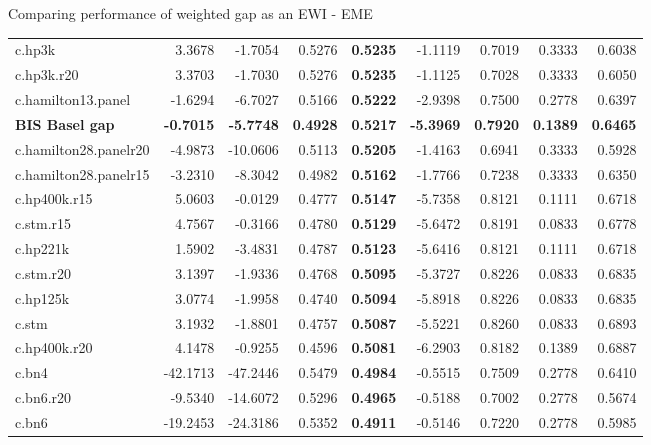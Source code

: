 \documentclass[
  ignorenonframetext,
]{beamer}
\begin{document}
\begin{frame}{Comparing performance of weighted gap as an EWI - EME}
{\begin{tabular}[t]{lrrr>{}rrrrr}
c.hp3k & 3.3678 & -1.7054 & 0.5276 & \textbf{0.5235} & -1.1119 & 0.7019 & 0.3333 & 0.6038\\
c.hp3k.r20 & 3.3703 & -1.7030 & 0.5276 & \textbf{0.5235} & -1.1125 & 0.7028 & 0.3333 & 0.6050\\
c.hamilton13.panel & -1.6294 & -6.7027 & 0.5166 & \textbf{0.5222} & -2.9398 & 0.7500 & 0.2778 & 0.6397\\
\textbf{BIS Basel gap} & \textbf{-0.7015} & \textbf{-5.7748} & \textbf{0.4928} & \textbf{\textbf{0.5217}} & \textbf{-5.3969} & \textbf{0.7920} & \textbf{0.1389} & \textbf{0.6465}\\
c.hamilton28.panelr20 & -4.9873 & -10.0606 & 0.5113 & \textbf{0.5205} & -1.4163 & 0.6941 & 0.3333 & 0.5928\\
\addlinespace
c.hamilton28.panelr15 & -3.2310 & -8.3042 & 0.4982 & \textbf{0.5162} & -1.7766 & 0.7238 & 0.3333 & 0.6350\\
c.hp400k.r15 & 5.0603 & -0.0129 & 0.4777 & \textbf{0.5147} & -5.7358 & 0.8121 & 0.1111 & 0.6718\\
c.stm.r15 & 4.7567 & -0.3166 & 0.4780 & \textbf{0.5129} & -5.6472 & 0.8191 & 0.0833 & 0.6778\\
c.hp221k & 1.5902 & -3.4831 & 0.4787 & \textbf{0.5123} & -5.6416 & 0.8121 & 0.1111 & 0.6718\\
c.stm.r20 & 3.1397 & -1.9336 & 0.4768 & \textbf{0.5095} & -5.3727 & 0.8226 & 0.0833 & 0.6835\\
\addlinespace
c.hp125k & 3.0774 & -1.9958 & 0.4740 & \textbf{0.5094} & -5.8918 & 0.8226 & 0.0833 & 0.6835\\
c.stm & 3.1932 & -1.8801 & 0.4757 & \textbf{0.5087} & -5.5221 & 0.8260 & 0.0833 & 0.6893\\
c.hp400k.r20 & 4.1478 & -0.9255 & 0.4596 & \textbf{0.5081} & -6.2903 & 0.8182 & 0.1389 & 0.6887\\
c.bn4 & -42.1713 & -47.2446 & 0.5479 & \textbf{0.4984} & -0.5515 & 0.7509 & 0.2778 & 0.6410\\
c.bn6.r20 & -9.5340 & -14.6072 & 0.5296 & \textbf{0.4965} & -0.5188 & 0.7002 & 0.2778 & 0.5674\\
\addlinespace
c.bn6 & -19.2453 & -24.3186 & 0.5352 & \textbf{0.4911} & -0.5146 & 0.7220 & 0.2778 & 0.5985\\
\bottomrule
\end{tabular}}
\end{frame}
\end{document}
